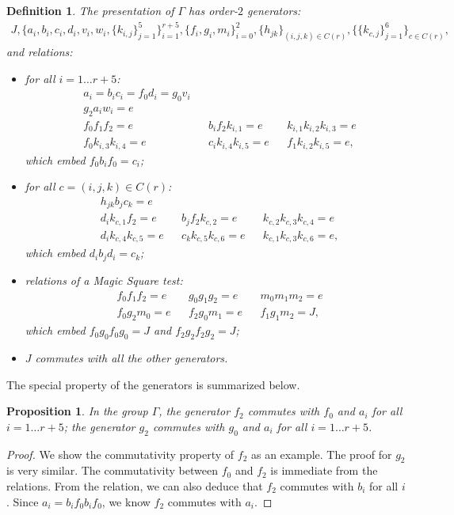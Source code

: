 \documentclass[11pt,letterpaper]{article}
\newcommand{\1}{\mathbb{1}}
\newtheorem{proposition}[theorem]{Proposition}
\newtheorem{definition}[theorem]{Definition}
\theoremstyle{definition}
\begin{document}
\begin{definition}
The presentation of $\Gamma$ has order-$2$ generators:
\begin{align*}
	J, \{a_i, b_i, c_i, d_i, v_i,w_i,\{ k_{i,j} \}_{j=1}^5\}_{i=1}^{r+5}, \{f_i,g_i,m_i\}_{i=0}^2, \{h_{jk}\}_{(i,j,k) \in C(r)}, 
	\{\{ k_{c,j} \}_{j=1}^6\}_{c \in C(r)},
\end{align*}
and relations:
\begin{itemize}
\item for all $i = 1 \dots r+5$:
\begin{align}
	&a_i = b_ic_i = f_0d_i = g_0v_i \\
	&g_2 a_i w_i = e \\
	&f_0 f_1 f_2 = e && b_i f_2 k_{i,1} = e && k_{i,1} k_{i,2} k_{i,3} = e\\
	&f_0 k_{i,3} k_{i,4} = e && c_i k_{i,4} k_{i,5} =e && f_1 k_{i,2} k_{i,5} = e,
\end{align}
which embed $f_0 b_i f_0 = c_i$;
\item for all $ c = (i,j,k) \in C(r)$:
\begin{align}
	&h_{jk}b_j c_k = e\\
	&d_i k_{c,1} f_2 = e && b_j f_2 k_{c,2} = e && k_{c,2} k_{c,3} k_{c,4} = e\\
	&d_i k_{c,4} k_{c,5} = e && c_k k_{c,5} k_{c,6} =e && k_{c,1} k_{c,3} k_{c,6} = e,
\end{align}
which embed $d_i b_j d_i = c_k$;
\item relations of a Magic Square test:
\begin{align}
	&f_0 f_1 f_2 = e && g_0 g_1 g_2 = e &&m_0 m_1 m_2 = e \\
	&f_0 g_2 m_0 = e && f_2 g_0 m_1 = e && f_1 g_1 m_2 = J,
\end{align}
which embed $f_0 g_0 f_0 g_0 = J$ and $f_2 g_2 f_2 g_2 = J$;
\item $J$ commutes with all the other generators.
\end{itemize}
\end{definition}
The special property of the generators is summarized below.
\begin{proposition}
	In the group $\Gamma$, the generator $f_2$ commutes with $f_0$ and $a_i$ for all $i = 1 \dots r+5$;
	the generator $g_2$ commutes with $g_0$ and $a_i$ for all $i = 1 \dots r+5$.
\end{proposition}
\begin{proof}
	We show the commutativity property of $f_2$ as an example. The proof for $g_2$ is very similar.
	The commutativity between $f_0$ and $f_2$ is immediate from the relations.
	From the relation, we can also deduce that $f_2$ commutes with $b_i$ for all $i$.
	Since $a_i = b_i f_0 b_i f_0$, we know $f_2$ commutes with $a_i$.
\end{proof}
\end{document}
